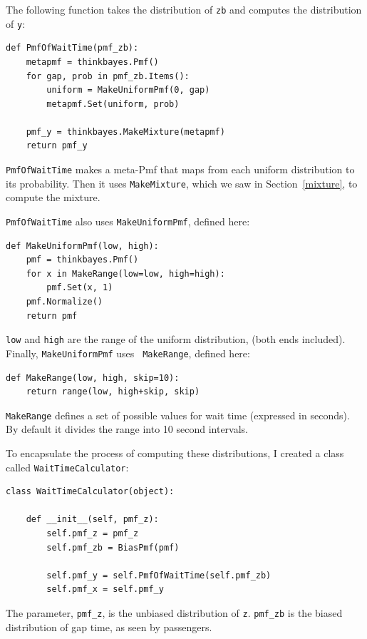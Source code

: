 \documentclass[12pt]{book}
\begin{document}
The following function takes the distribution of {\tt zb} and
computes the distribution of {\tt y}:

\begin{verbatim}
def PmfOfWaitTime(pmf_zb):
    metapmf = thinkbayes.Pmf()
    for gap, prob in pmf_zb.Items():
        uniform = MakeUniformPmf(0, gap)
        metapmf.Set(uniform, prob)

    pmf_y = thinkbayes.MakeMixture(metapmf)
    return pmf_y
\end{verbatim}

{\tt PmfOfWaitTime} makes a meta-Pmf that maps from each uniform
distribution to its probability.  Then it uses {\tt MakeMixture},
which we saw in Section~\ref{mixture}, to compute the mixture.

{\tt PmfOfWaitTime} also uses {\tt MakeUniformPmf}, defined here:

\begin{verbatim}
def MakeUniformPmf(low, high):
    pmf = thinkbayes.Pmf()
    for x in MakeRange(low=low, high=high):
        pmf.Set(x, 1)
    pmf.Normalize()
    return pmf
\end{verbatim}

{\tt low} and {\tt high} are the range of the uniform distribution,
(both ends included).  Finally, {\tt MakeUniformPmf} uses {\tt
  MakeRange}, defined here:

\begin{verbatim}
def MakeRange(low, high, skip=10):
    return range(low, high+skip, skip)
\end{verbatim}

{\tt MakeRange} defines a set of possible values for wait time
(expressed in seconds).  By default it divides the range into 
10 second intervals.

To encapsulate the process of computing these distributions, I
created a class called {\tt WaitTimeCalculator}:

\begin{verbatim}
class WaitTimeCalculator(object):

    def __init__(self, pmf_z):
        self.pmf_z = pmf_z
        self.pmf_zb = BiasPmf(pmf)

        self.pmf_y = self.PmfOfWaitTime(self.pmf_zb)
        self.pmf_x = self.pmf_y
\end{verbatim}

The parameter, \verb"pmf_z", is the unbiased distribution of {\tt z}.
\verb"pmf_zb" is the biased distribution of gap time, as seen by
passengers.
\end{document}
